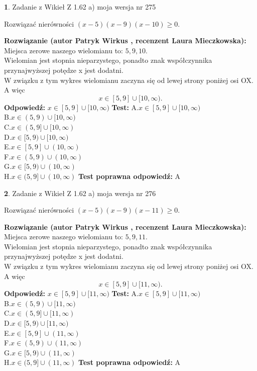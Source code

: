 \documentclass[12pt, a4paper]{article}
\theoremstyle{definition} %
\newtheorem{zad}{}
\newcommand{\zadStart}[1]{\begin{zad}#1\newline}
\newcommand{\zadStop}{\end{zad}}
\newcommand{\rozwStart}[2]{\noindent \textbf{Rozwiązanie (autor #1 , recenzent #2): }\newline}
\newcommand{\rozwStop}{\newline}
\newcommand{\odpStart}{\noindent \textbf{Odpowiedź:}\newline}
\newcommand{\odpStop}{\newline}
\newcommand{\testStart}{\noindent \textbf{Test:}\newline}
\newcommand{\testStop}{\newline}
\newcommand{\kluczStart}{\noindent \textbf{Test poprawna odpowiedź:}\newline}
\newcommand{\kluczStop}{\newline}
\begin{document}
\zadStart{Zadanie z Wikieł Z 1.62 a) moja wersja nr 275}

Rozwiązać nierówności $(x-5)(x-9)(x-10)\ge0$.
\zadStop
\rozwStart{Patryk Wirkus}{Laura Mieczkowska}
Miejsca zerowe naszego wielomianu to: $5, 9, 10$.\\
Wielomian jest stopnia nieparzystego, ponadto znak współczynnika przy\linebreak najwyższej potędze x jest dodatni.\\ W związku z tym wykres wielomianu zaczyna się od lewej strony poniżej osi OX. A więc $$x \in [5,9] \cup [10,\infty).$$
\rozwStop
\odpStart
$x \in [5,9] \cup [10,\infty)$
\odpStop
\testStart
A.$x \in [5,9] \cup [10,\infty)$\\
B.$x \in (5,9) \cup [10,\infty)$\\
C.$x \in (5,9] \cup [10,\infty)$\\
D.$x \in [5,9) \cup [10,\infty)$\\
E.$x \in [5,9] \cup (10,\infty)$\\
F.$x \in (5,9) \cup (10,\infty)$\\
G.$x \in [5,9) \cup (10,\infty)$\\
H.$x \in (5,9] \cup (10,\infty)$
\testStop
\kluczStart
A
\kluczStop



\zadStart{Zadanie z Wikieł Z 1.62 a) moja wersja nr 276}

Rozwiązać nierówności $(x-5)(x-9)(x-11)\ge0$.
\zadStop
\rozwStart{Patryk Wirkus}{Laura Mieczkowska}
Miejsca zerowe naszego wielomianu to: $5, 9, 11$.\\
Wielomian jest stopnia nieparzystego, ponadto znak współczynnika przy\linebreak najwyższej potędze x jest dodatni.\\ W związku z tym wykres wielomianu zaczyna się od lewej strony poniżej osi OX. A więc $$x \in [5,9] \cup [11,\infty).$$
\rozwStop
\odpStart
$x \in [5,9] \cup [11,\infty)$
\odpStop
\testStart
A.$x \in [5,9] \cup [11,\infty)$\\
B.$x \in (5,9) \cup [11,\infty)$\\
C.$x \in (5,9] \cup [11,\infty)$\\
D.$x \in [5,9) \cup [11,\infty)$\\
E.$x \in [5,9] \cup (11,\infty)$\\
F.$x \in (5,9) \cup (11,\infty)$\\
G.$x \in [5,9) \cup (11,\infty)$\\
H.$x \in (5,9] \cup (11,\infty)$
\testStop
\kluczStart
A
\kluczStop
\end{document}
